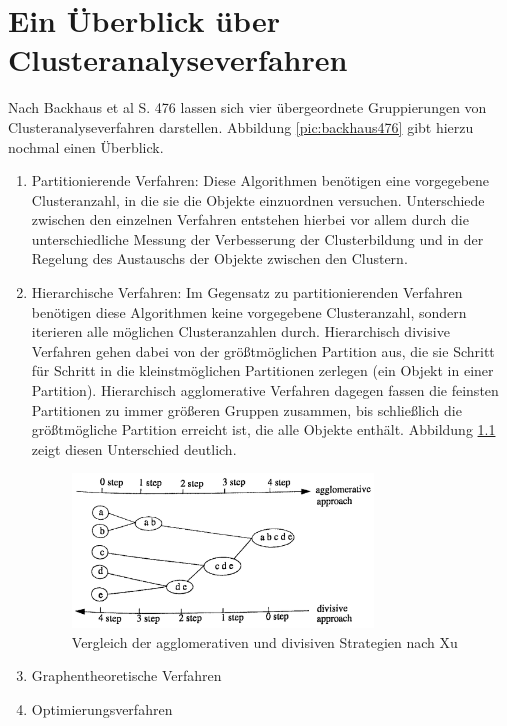 \chapter{Ein Überblick über Clusteranalyseverfahren}

Nach Backhaus et al \cite{Backhaus.2016} S. 476 lassen sich vier übergeordnete Gruppierungen von Clusteranalyseverfahren darstellen. Abbildung \ref{pic:backhaus476} gibt hierzu nochmal einen Überblick.

\begin{enumerate}
	\item Partitionierende Verfahren: Diese Algorithmen benötigen eine vorgegebene Clusteranzahl, in die sie die Objekte einzuordnen versuchen. Unterschiede zwischen den einzelnen Verfahren entstehen hierbei vor allem durch die unterschiedliche Messung der Verbesserung der Clusterbildung und in der Regelung des Austauschs der Objekte zwischen den Clustern.
	\item Hierarchische Verfahren: Im Gegensatz zu partitionierenden Verfahren benötigen diese Algorithmen keine vorgegebene Clusteranzahl, sondern iterieren alle möglichen Clusteranzahlen durch. Hierarchisch divisive Verfahren gehen dabei von der größtmöglichen Partition aus, die sie Schritt für Schritt in die kleinstmöglichen Partitionen zerlegen (ein Objekt in einer Partition). Hierarchisch agglomerative Verfahren dagegen fassen die feinsten Partitionen zu immer größeren Gruppen zusammen, bis schließlich die größtmögliche Partition erreicht ist, die alle Objekte enthält. Abbildung \ref{pic:xu21} zeigt diesen Unterschied deutlich.
	\begin{figure}[h]
		\begin{center}
			\includegraphics[width=8cm]{pics/xu21.png}
		\end{center}
		\caption{Vergleich der agglomerativen und divisiven Strategien nach Xu}
		\label{pic:xu21}
	\end{figure}
	\item Graphentheoretische Verfahren
	\item Optimierungsverfahren
\end{enumerate}

